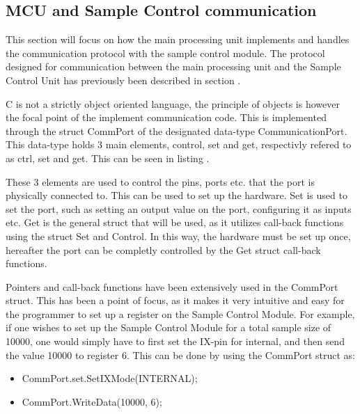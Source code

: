 \subsection{MCU and Sample Control communication} \label{subsec:MCUSCCommunication} 
This section will focus on how the main processing unit implements and handles the communication protocol with the sample control module. 
The protocol designed for communication between the main processing unit and the Sample Control Unit has previously been described in section .

C is not a strictly object oriented language, the principle of objects is however the focal point of the implement communication code. This is implemented through the struct CommPort of the designated data-type CommunicationPort. This data-type holds 3 main elements, control, set and get, respectivly refered to as ctrl, set and get. This can be seen in listing .



These 3 elements are used to control the pins, ports etc. that the port is physically connected to. This can be used to set up the hardware. Set is used to set the port, such as setting an output value on the port, configuring it as inputs etc. Get is the general struct that will be used, as it utilizes call-back functions using the struct Set and Control. In this way, the hardware must be set up once, hereafter the port can be completly controlled by the Get struct call-back functions. 

Pointers and call-back functions have been extensively used in the CommPort struct. This has been a point of focus, as it makes it very intuitive and easy for the programmer to set up a register on the Sample Control Module. For example, if one wishes to set up the Sample Control Module for a total sample size of 10000, one would simply have to first set the IX-pin for internal, and then send the value 10000 to register 6. This can be done by using the CommPort struct as:

\begin{itemize}
    \item CommPort.set.SetIXMode(INTERNAL);
    \item CommPort.WriteData(10000, 6);
\end{itemize}

